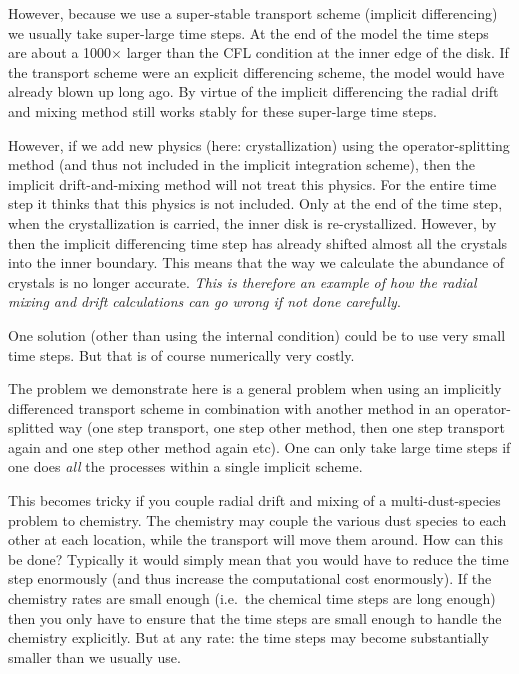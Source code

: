 \documentclass{book}
\begin{document}
However, because we use a super-stable transport scheme (implicit differencing)
we usually take super-large time steps. At the end of the model the time steps
are about a 1000$\times$ larger than the CFL condition at the inner edge of the
disk. If the transport scheme were an explicit differencing scheme, the model
would have already blown up long ago. By virtue of the implicit differencing
the radial drift and mixing method still works stably for these super-large
time steps.

However, if we add new physics (here: crystallization) using the
operator-splitting method (and thus not included in the implicit integration
scheme), then the implicit drift-and-mixing method will not treat this
physics. For the entire time step it thinks that this physics is not
included. Only at the end of the time step, when the crystallization is carried,
the inner disk is re-crystallized. However, by then the implicit differencing
time step has already shifted almost all the crystals into the inner boundary.
This means that the way we calculate the abundance of crystals is no longer
accurate. {\em This is therefore an example of how the radial mixing and drift
  calculations can go wrong if not done carefully}.

One solution (other than using the internal condition) could be to use
very small time steps. But that is of course numerically very costly.

The problem we demonstrate here is a general problem when using an implicitly
differenced transport scheme in combination with another method in an
operator-splitted way (one step transport, one step other method, then one step
transport again and one step other method again etc). One can only take large
time steps if one does {\em all} the processes within a single implicit scheme.

This becomes tricky if you couple radial drift and mixing of a multi-dust-species
problem to chemistry. The chemistry may couple the various dust species to each
other at each location, while the transport will move them around. How can this
be done? Typically it would simply mean that you would have to reduce the time
step enormously (and thus increase the computational cost enormously). If the
chemistry rates are small enough (i.e.\ the chemical time steps are long enough)
then you only have to ensure that the time steps are small enough to handle the
chemistry explicitly. But at any rate: the time steps may become substantially
smaller than we usually use.
\end{document}
